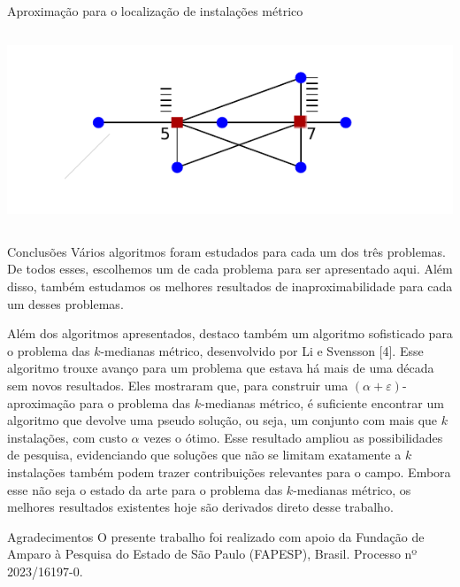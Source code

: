 \documentclass[final]{beamer}
\let\epsilon=\varepsilon
\begin{document}
\begin{frame}[t]
\begin{columns}[t]
\begin{column}{0.48\paperwidth}
\begin{block}{Aproximação para o localização de instalações métrico}
\begin{columns}
\begin{column}{0.23\paperwidth}
          \begin{tcolorbox}
            \vspace{-1cm}\hspace{-2.3cm}\includegraphics[scale=1.9]{imgs/fl4.pdf}\vspace{-1cm}
          \end{tcolorbox}
        \end{column}
      \end{columns}

    \end{block}

    \begin{block}{Conclusões}
      Vários algoritmos foram estudados para cada um dos três problemas. De todos esses, escolhemos um de cada problema para ser apresentado aqui. Além disso, também estudamos os melhores resultados de inaproximabilidade para cada um desses problemas.

      Além dos algoritmos apresentados, destaco também um algoritmo sofisticado para o problema das $k$-medianas métrico, desenvolvido por Li e Svensson [4]. Esse algoritmo trouxe avanço para um problema que estava há mais de uma década sem novos resultados. Eles mostraram que, para construir uma $(\alpha + \epsilon)$-aproximação para o problema das $k$-medianas métrico, é suficiente encontrar um algoritmo que devolve uma pseudo solução, ou seja, um conjunto com mais que $k$ instalações, com custo $\alpha$ vezes o ótimo. Esse resultado ampliou as possibilidades de pesquisa, evidenciando que soluções que não se limitam exatamente a $k$ instalações também podem trazer contribuições relevantes para o campo. Embora esse não seja o estado da arte para o problema das $k$-medianas métrico, os melhores resultados existentes hoje são derivados direto desse trabalho.
    \end{block}
    \begin{block}{Agradecimentos}
      O presente trabalho foi realizado com apoio da Fundação de Amparo à Pesquisa do Estado de São Paulo (FAPESP), Brasil. Processo nº 2023/16197-0.
    

\end{block}
\end{column}
\end{columns}
\end{frame}
\end{document}
